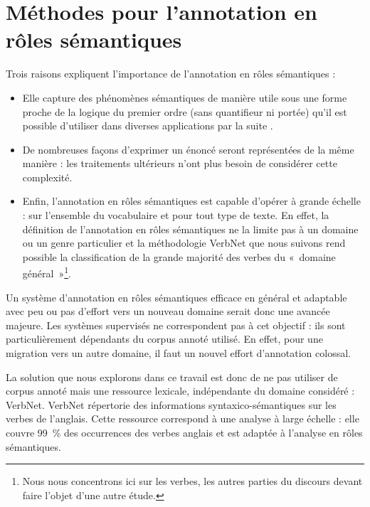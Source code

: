 \documentclass[oneside,parskip,draft]{scrbook}
\begin{document}




\part{Méthodes pour l'annotation en rôles sémantiques}
\label{part:srl}

Trois raisons expliquent l'importance de l'annotation en rôles sémantiques :

\begin{itemize}

    \item Elle capture des phénomènes sémantiques de manière utile sous une
        forme proche de la logique du premier ordre (sans quantifieur ni
        portée) qu'il est possible d'utiliser dans diverses applications par la
        suite \citep{osman2012improved,xie2013semantic}.

    \item De nombreuses façons d'exprimer un énoncé seront représentées de la
        même manière : les traitements ultérieurs n'ont plus besoin de
        considérer cette complexité.

    \item Enfin, l'annotation en rôles sémantiques est capable d'opérer à
        grande échelle : sur l'ensemble du vocabulaire et pour tout type de
        texte.  En effet, la définition de l'annotation en rôles sémantiques ne
        la limite pas à un domaine ou un genre particulier et la méthodologie
        VerbNet que nous suivons rend possible la classification de la grande
        majorité des verbes du «~domaine général~»\footnote{Nous nous
            concentrons ici sur les verbes, les autres parties du discours
        devant faire l'objet d'une autre étude.}.

\end{itemize}

Un système d'annotation en rôles sémantiques efficace en général et adaptable
avec peu ou pas d'effort vers un nouveau domaine serait donc une avancée
majeure. Les systèmes supervisés ne correspondent pas à cet objectif : ils sont
particulièrement dépendants du corpus annoté utilisé. En effet, pour une
migration vers un autre domaine, il faut un nouvel effort d'annotation
colossal.

La solution que nous explorons dans ce travail est donc de ne pas utiliser de
corpus annoté mais une ressource lexicale, indépendante du domaine considéré :
VerbNet. VerbNet répertorie des informations syntaxico-sémantiques sur les
verbes de l'anglais.  Cette ressource correspond à une analyse à large échelle
: elle couvre 99~\% des occurrences des verbes anglais \citep[partie 1,
p~.53]{palmer2013semantic} et est adaptée à l'analyse en rôles sémantiques.
\end{document}
